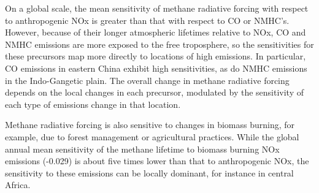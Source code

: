 On a global scale, the mean sensitivity of methane radiative forcing with respect to anthropogenic NOx is greater than that with respect to CO or NMHC's. However, because of their longer atmospheric lifetimes relative to NOx, CO and NMHC emissions are more exposed to the free troposphere, so the sensitivities for these precursors map more directly to locations of high emissions. In particular, CO emissions in eastern China exhibit high sensitivities, as do NMHC emissions in the Indo-Gangetic plain. The overall change in methane radiative forcing depends on the local changes in each precursor, modulated by the sensitivity of each type of emissions change in that location.


Methane radiative forcing is also sensitive to changes in biomass burning, for example, due to forest management or agricultural practices. While the global annual mean sensitivity of the methane lifetime to biomass burning NOx emissions (-0.029) is about five times lower than that to anthropogenic NOx, the sensitivity to these emissions can be locally dominant, for instance in central Africa.
